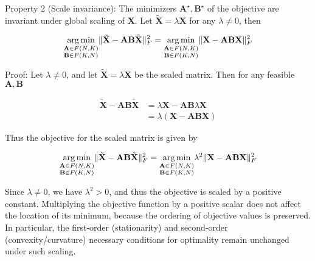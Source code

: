 \documentclass[oneside]{article}
\begin{document}
Property 2 (Scale invariance): The minimizers $\mathbf{A}^\star, \mathbf{B}^\star$ of the objective are invariant under global scaling of $\mathbf{X}$. Let $\tilde{\mathbf{X}} = \lambda \mathbf{X}$ for any $\lambda \neq 0$, then

\begin{equation}
    \underset{\begin{subarray}{c} \mathbf{A} \in F(N, K) \\ \mathbf{B} \in F(K, N) \end{subarray}}{\arg \min} \| \tilde{\mathbf{X}} - \mathbf{A} \mathbf{B} \tilde{\mathbf{X}} \|_F^2 
    = 
    \underset{\begin{subarray}{c} \mathbf{A} \in F(N, K) \\ \mathbf{B} \in F(K, N) \end{subarray}}{\arg \min} \| \mathbf{X} - \mathbf{A} \mathbf{B} \mathbf{X}\|_F^2 
\end{equation}

Proof: Let $\lambda \neq 0$, and let $\tilde{\mathbf{X}} = \lambda \mathbf{X}$ be the scaled matrix. Then for any feasible $\mathbf{A}, \mathbf{B}$

\begin{equation}
    \begin{aligned}
    \tilde{\mathbf{X}} - \mathbf{A} \mathbf{B} \tilde{\mathbf{X}} 
    &= \lambda \mathbf{X} - \mathbf{A} \mathbf{B} \lambda \mathbf{X} \\
    &= \lambda \left( \mathbf{X} - \mathbf{A} \mathbf{B} \mathbf{X} \right)
    \end{aligned}
\end{equation}

Thus the objective for the scaled matrix is given by

\begin{equation}
    \underset{\begin{subarray}{c} \mathbf{A} \in F(N, K) \\ \mathbf{B} \in F(K, N) \end{subarray}}{\arg \min} \| \tilde{\mathbf{X}} - \mathbf{A} \mathbf{B} \tilde{\mathbf{X}} \|_F^2 = \underset{\begin{subarray}{c} \mathbf{A} \in F(N, K) \\ \mathbf{B} \in F(K, N) \end{subarray}}{\arg \min} \lambda^2 \| \mathbf{X} - \mathbf{A} \mathbf{B} \mathbf{X} \|_F^2
\end{equation}

Since $\lambda \neq 0$, we have $\lambda^2 > 0$, and thus the objective is scaled by a positive constant. Multiplying the objective function by a positive scalar does not affect the location of its minimum, because the ordering of objective values is preserved. In particular, the first-order (stationarity) and second-order (convexity/curvature) necessary conditions for optimality remain unchanged under such scaling. 
\end{document}
